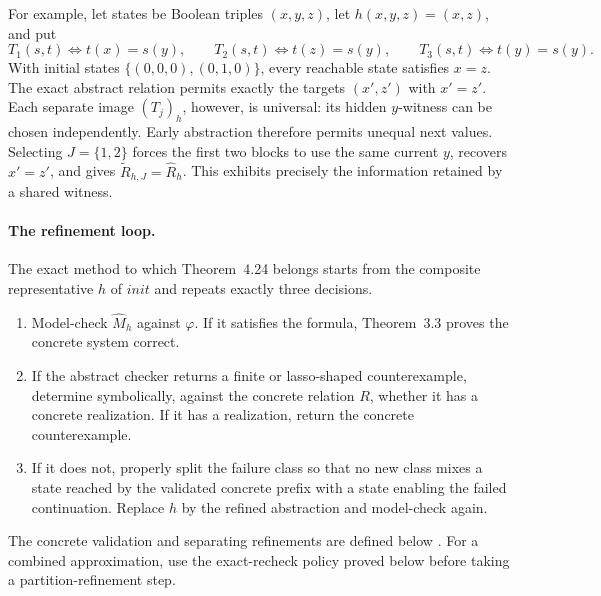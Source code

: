 For example, let states be Boolean triples \((x,y,z)\), let
\(h(x,y,z)=(x,z)\), and put
\[
 T_1(s,t)\iff t(x)=s(y),\qquad
 T_2(s,t)\iff t(z)=s(y),\qquad
 T_3(s,t)\iff t(y)=s(y).
\]
With initial states \(\{(0,0,0),(0,1,0)\}\), every reachable state satisfies
\(x=z\). The exact abstract relation permits exactly the targets
\((x',z')\) with \(x'=z'\). Each separate image \((T_j)_h\), however, is
universal: its hidden \(y\)-witness can be chosen independently.
Early abstraction therefore permits unequal next values.
Selecting \(J=\{1,2\}\) forces the first two blocks to use the same current
\(y\), recovers \(x'=z'\), and gives
\(\widetilde R_{h,J}=\widehat R_h\). This exhibits precisely the information
retained by a shared witness.

\paragraph{The refinement loop.}
The exact method to which Theorem~4.24 belongs starts from the composite
representative \(h\) of \(init\) and repeats exactly three decisions.
\begin{enumerate}
\item Model-check \(\widehat M_h\) against \(\varphi\).  If it satisfies the
formula, Theorem~3.3 proves the concrete system correct.
\item If the abstract checker returns a finite or lasso-shaped counterexample,
determine symbolically, against the concrete relation \(R\), whether it has a
concrete realization.  If it has a realization, return the concrete
counterexample.
\item If it does not, properly split the failure class so that no new class
mixes a state reached by the validated concrete prefix with a state enabling
the failed continuation. Replace \(h\) by the refined abstraction and
model-check again.
\end{enumerate}
The concrete validation and separating refinements are defined below
\cite[\S4.1]{ClarkeEtAl2003}.
For a combined approximation, use the exact-recheck policy proved below
before taking a partition-refinement step.

